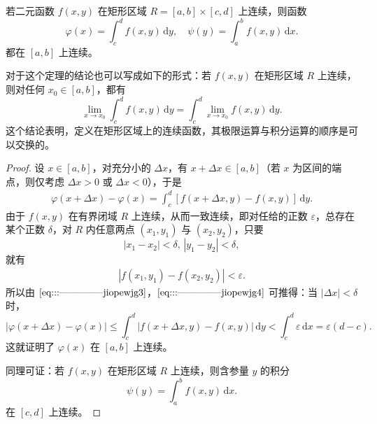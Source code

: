 \documentclass[../../main.tex]{subfiles}
\begin{document}
\begin{theorem}[连续性]\label{theorem:含参量积分的连续性}
若二元函数 \( f(x,y) \) 在矩形区域 \( R = [a,b] \times [c,d] \) 上连续，则函数
\[
\varphi(x) = \int_{c}^{d} f(x,y) \, \mathrm{d}y,\quad \psi(y) = \int_{a}^{b} f(x,y) \, \mathrm{d}x .
\]
都在 \( [a,b] \) 上连续。
\end{theorem}
\begin{remark}
对于这个定理的结论也可以写成如下的形式：若 \( f(x,y) \) 在矩形区域 \( R \) 上连续，则对任何 \( x_0 \in [a,b] \)，都有
\[
\lim_{x \to x_0} \int_{c}^{d} f(x,y) \, \mathrm{d}y = \int_{c}^{d} \lim_{x \to x_0} f(x,y) \, \mathrm{d}y.
\]
这个结论表明，定义在矩形区域上的连续函数，其极限运算与积分运算的顺序是可以交换的。
\end{remark}
\begin{proof}
设 \( x \in [a,b] \)，对充分小的 \( \Delta x \)，有 \( x + \Delta x \in [a,b] \)（若 \( x \) 为区间的端点，则仅考虑 \( \Delta x > 0 \) 或 \( \Delta x < 0 \)），于是
\begin{align}
\varphi(x + \Delta x) - \varphi(x) = \int_{c}^{d} [f(x + \Delta x,y) - f(x,y)] \, \mathrm{d}y. \label{eq:::--------------jiopewjg3}
\end{align}
由于 \( f(x,y) \) 在有界闭域 \( R \) 上连续，从而一致连续，即对任给的正数 \( \varepsilon \)，总存在某个正数 \( \delta \)，对 \( R \) 内任意两点 \( (x_1,y_1) \) 与 \( (x_2,y_2) \)，只要
\[
|x_1 - x_2| < \delta, \, |y_1 - y_2| < \delta,
\]
就有
\begin{align}
|f(x_1,y_1) - f(x_2,y_2)| < \varepsilon.\label{eq:::--------------jiopewjg4}
\end{align}
所以由 \(\eqref{eq:::--------------jiopewjg3}\)，\(\eqref{eq:::--------------jiopewjg4}\) 可推得：当 \( |\Delta x| < \delta \) 时，
\[
|\varphi(x + \Delta x) - \varphi(x)| \leqslant \int_{c}^{d} |f(x + \Delta x,y) - f(x,y)| \, \mathrm{d}y
< \int_{c}^{d} \varepsilon \, \mathrm{d}x = \varepsilon(d - c).
\]
这就证明了 \( \varphi(x) \) 在 \( [a,b] \) 上连续。

同理可证：若 \( f(x,y) \) 在矩形区域 \( R \) 上连续，则含参量 \( y \) 的积分
\[
\psi(y) = \int_{a}^{b} f(x,y) \, \mathrm{d}x .
\]
在 \( [c,d] \) 上连续。

\end{proof}
\end{document}
